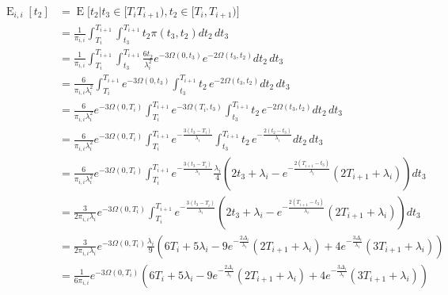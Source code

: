\documentclass{article}
\DeclareMathOperator{\E}{E}
\begin{document}
\begin{align}
    \begin{split}
        \E_{i,i}[t_2] &= \E\big[t_2|t_3 \in [T_i T_{i+1}),t_2 \in [T_i,T_{i+1}) \big]\\
                      &= \frac{1}{\pi_{i,i}}\int_{T_i}^{T_{i+1}}\int_{t_3}^{T_{i+1}}t_2\pi(t_3,t_2)dt_2\,dt_3\\
                      &= \frac{1}{\pi_{i,i}}\int_{T_i}^{T_{i+1}}\int_{t_3}^{T_{i+1}}
                        \frac{6t_2}{\lambda_i^2}e^{-3\Omega(0,t_3)}e^{-2\Omega(t_3,t_2)}dt_2\,dt_3\\
                      &= \frac{6}{\pi_{i,i}\lambda_i^2}\int_{T_i}^{T_{i+1}}
                        e^{-3\Omega(0,t_3)}\int_{t_3}^{T_{i+1}}t_2\,e^{-2\Omega(t_3,t_2)}dt_2\,dt_3\\
                      &= \frac{6}{\pi_{i,i}\lambda_i^2}e^{-3\Omega(0,T_i)}
                        \int_{T_i}^{T_{i+1}}
                        e^{-3\Omega(T_i,t_3)}\int_{t_3}^{T_{i+1}}t_2\,e^{-2\Omega(t_3,t_2)}dt_2\,dt_3\\
                      &= \frac{6}{\pi_{i,i}\lambda_i^2}e^{-3\Omega(0,T_i)}
                        \int_{T_i}^{T_{i+1}}
                        e^{-\frac{3(t_3-T_i)}{\lambda_i}}\int_{t_3}^{T_{i+1}}t_2\,e^{-\frac{2(t_2-t_3)}{\lambda_i}}dt_2\,dt_3\\
                      &= \frac{6}{\pi_{i,i}\lambda_i^2}e^{-3\Omega(0,T_i)}
                        \int_{T_i}^{T_{i+1}}
                        e^{-\frac{3(t_3-T_i)}{\lambda_i}}
                        \frac{\lambda_i}{4}\left(2t_3+\lambda_i-e^{-\frac{2(T_{i+1}-t_3)}{\lambda_i}}\left(2T_{i+1}+\lambda_i\right)\right)
                        dt_3\\
                      &= \frac{3}{2\pi_{i,i}\lambda_i}e^{-3\Omega(0,T_i)}
                        \int_{T_i}^{T_{i+1}}
                        e^{-\frac{3(t_3-T_i)}{\lambda_i}}
                        \left(2t_3+\lambda_i-e^{-\frac{2(T_{i+1}-t_3)}{\lambda_i}}\left(2T_{i+1}+\lambda_i\right)\right)
                        dt_3\\
                      &= \frac{3}{2\pi_{i,i}\lambda_i}e^{-3\Omega(0,T_i)}
                        \frac{\lambda_i}{9}\left(6T_i+5\lambda_i-9e^{-\frac{2\Delta_i}{\lambda_i}}(2T_{i+1}+\lambda_i)+
                        4e^{-\frac{3\Delta_i}{\lambda_i}}\left(3T_{i+1}+\lambda_i\right)\right)\\
                      &= \frac{1}{6\pi_{i,i}}e^{-3\Omega(0,T_i)}
                        \left(6T_i+5\lambda_i-9e^{-\frac{2\Delta_i}{\lambda_i}}(2T_{i+1}+\lambda_i)+
                        4e^{-\frac{3\Delta_i}{\lambda_i}}\left(3T_{i+1}+\lambda_i\right)\right)
    \end{split}
\end{align}
\end{document}
